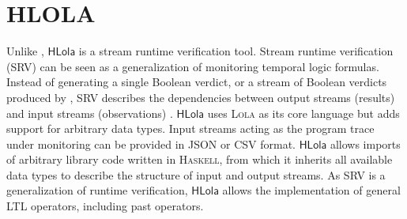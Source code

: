 \section{HLOLA}
Unlike \MonPoly, $\mathsf{HLola}$ \cite{gorostiagaHLolaVeryFunctional2021} is a stream runtime verification tool. Stream runtime verification (SRV) can be seen as a generalization of monitoring temporal logic formulas. Instead of generating a single Boolean verdict, or a stream of Boolean verdicts produced by \MonPoly, SRV describes the dependencies between output streams (results) and input streams (observations) \cite{gorostiagaStriverStreamRuntime2018}. $\mathsf{HLola}$ uses \textsc{Lola} as its core language but adds support for arbitrary data types. Input streams acting as the program trace under monitoring can be provided in JSON or CSV format. $\mathsf{HLola}$ allows imports of arbitrary library code written in \textsc{Haskell}, from which it inherits all available data types to describe the structure of input and output streams. As SRV is a generalization of runtime verification, $\mathsf{HLola}$ allows the implementation of general LTL operators, including past operators.

